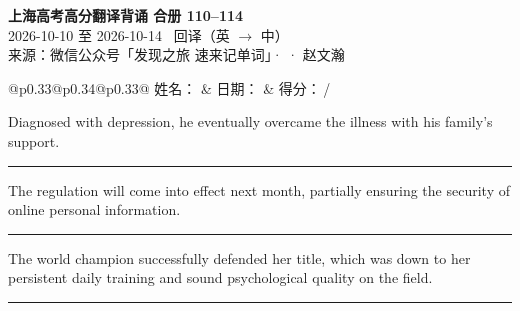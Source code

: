 \documentclass[11pt,a4paper]{article}
\newcommand{\num}[1]{\makebox[1.9em][r]{#1.}\hspace{0.3em}}
\newcommand{\wline}{\noindent\rule{\linewidth}{0.4pt}}
\begin{document}
\pagestyle{plain}
\begin{center}
{\LARGE\bfseries 上海高考高分翻译背诵 \quad 合册 110–114}\\[0.25em]
{\large 2026-10-10 至 2026-10-14 \quad\ 回译（英 $\to$ 中）}\\[0.35em]
{\footnotesize 来源：微信公众号「发现之旅 速来记单词」·  · 赵文瀚}
\end{center}

\vspace{0.4em}
\noindent\begin{tabular}{@{}p{0.33\textwidth}@{}p{0.34\textwidth}@{}p{0.33\textwidth}@{}}
姓名：\underline{\hspace{2.0cm}} & 日期：\underline{\hspace{2.0cm}} & 得分：\underline{\hspace{1.4cm}}\,/ \\
\end{tabular}

\vspace{0.5em}

\vspace{0.8em}
\vspace{0.35em}\vspace{0.15em}

\begin{minipage}{\linewidth}

\num{1}Diagnosed with depression, he eventually overcame the illness with his family’s support.

\vspace{0.25em}

\wline

\end{minipage}

\begin{minipage}{\linewidth}

\num{2}The regulation will come into effect next month, partially ensuring the security of online personal information.

\vspace{0.25em}

\wline

\end{minipage}

\begin{minipage}{\linewidth}

\num{3}The world champion successfully defended her title, which was down to her persistent daily training and sound psychological quality on the field.

\vspace{0.25em}

\wline

\end{minipage}
\end{document}
